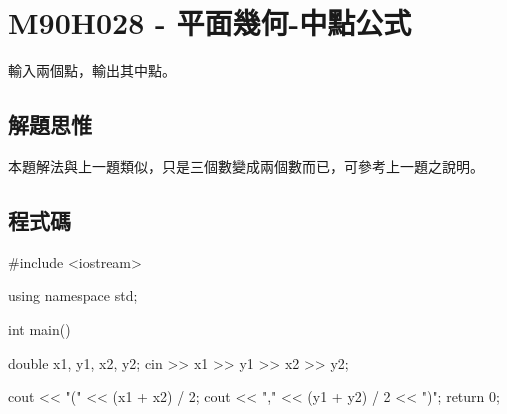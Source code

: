 \section{M90H028 - 平面幾何-中點公式}
輸入兩個點，輸出其中點。
\subsection{解題思惟}
本題解法與上一題類似，只是三個數變成兩個數而已，可參考上一題之說明。
\subsection{程式碼}
\begin{cppcode}
#include <iostream>

using namespace std;

int main()
{
	double x1, y1, x2, y2;
	cin >> x1 >> y1 >> x2 >> y2;
	
	cout << "(" << (x1 + x2) / 2;
	cout << "," << (y1 + y2) / 2 << ")";	
	return 0;	    
}
\end{cppcode}

